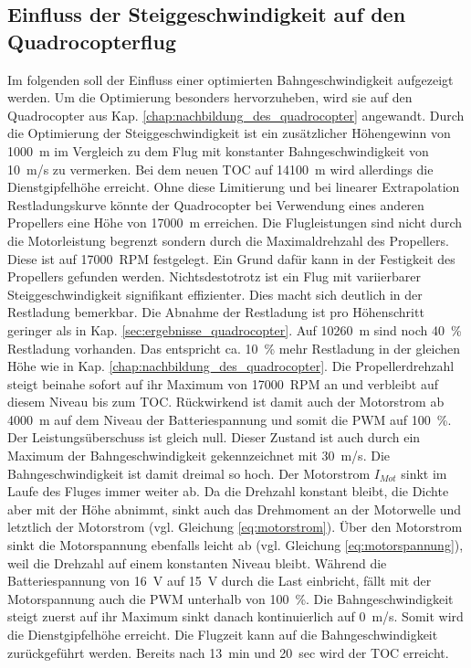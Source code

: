 \subsection{Einfluss der Steiggeschwindigkeit auf den Quadrocopterflug}
Im folgenden soll der Einfluss einer optimierten Bahngeschwindigkeit aufgezeigt werden. Um die Optimierung besonders hervorzuheben, wird sie auf den Quadrocopter aus Kap. \ref{chap:nachbildung_des_quadrocopter} angewandt. 
Durch die Optimierung der Steiggeschwindigkeit ist ein zusätzlicher Höhengewinn von \SI{1000}{m} im Vergleich zu dem Flug mit konstanter Bahngeschwindigkeit von \SI{10}{m/s} zu vermerken. Bei dem neuen TOC auf \SI{14100}{m} wird allerdings die Dienstgipfelhöhe erreicht. Ohne diese Limitierung und bei linearer Extrapolation Restladungskurve könnte der Quadrocopter bei Verwendung eines anderen Propellers eine Höhe von \SI{17000}{m} erreichen. Die Flugleistungen sind nicht durch die Motorleistung begrenzt sondern durch die Maximaldrehzahl des Propellers. Diese ist auf \SI{17000}{RPM} festgelegt. Ein Grund dafür kann in der Festigkeit des Propellers gefunden werden. Nichtsdestotrotz ist ein Flug mit variierbarer Steiggeschwindigkeit signifikant effizienter. Dies macht sich deutlich in der Restladung bemerkbar. Die Abnahme der Restladung ist pro Höhenschritt geringer als in Kap. \ref{sec:ergebnisse_quadrocopter}. Auf \SI{10260}{m} sind noch \SI{40}{\%} Restladung vorhanden. Das entspricht ca. \SI{10}{\%} mehr Restladung in der gleichen Höhe wie in Kap. \ref{chap:nachbildung_des_quadrocopter}. Die Propellerdrehzahl steigt beinahe sofort auf ihr Maximum von \SI{17000}{RPM} an und verbleibt auf diesem Niveau bis zum TOC. Rückwirkend ist damit auch der Motorstrom ab \SI{4000}{m} auf dem Niveau der Batteriespannung und somit die PWM auf \SI{100}{\%}. Der Leistungsüberschuss ist gleich null. Dieser Zustand ist auch durch ein Maximum der Bahngeschwindigkeit gekennzeichnet mit \SI{30}{m/s}. Die Bahngeschwindigkeit ist damit dreimal so hoch. Der Motorstrom \ensuremath{I_{Mot}} sinkt im Laufe des Fluges immer weiter ab. Da die Drehzahl konstant bleibt, die Dichte aber mit der Höhe abnimmt, sinkt auch das Drehmoment an der Motorwelle und letztlich der Motorstrom (vgl. Gleichung \ref{eq:motorstrom}). Über den Motorstrom sinkt die Motorspannung ebenfalls leicht ab (vgl. Gleichung \ref{eq:motorspannung}), weil die Drehzahl auf einem konstanten Niveau bleibt. Während die Batteriespannung von \SI{16}{V} auf \SI{15}{V} durch die Last einbricht, fällt mit der Motorspannung auch die PWM unterhalb von \SI{100}{\%}. Die Bahngeschwindigkeit steigt zuerst auf ihr Maximum  sinkt danach kontinuierlich auf \SI{0}{m/s}. Somit wird die Dienstgipfelhöhe erreicht. Die Flugzeit kann auf die Bahngeschwindigkeit zurückgeführt werden. Bereits nach \SI{13}{min} und \SI{20}{sec} wird der TOC erreicht. \\
